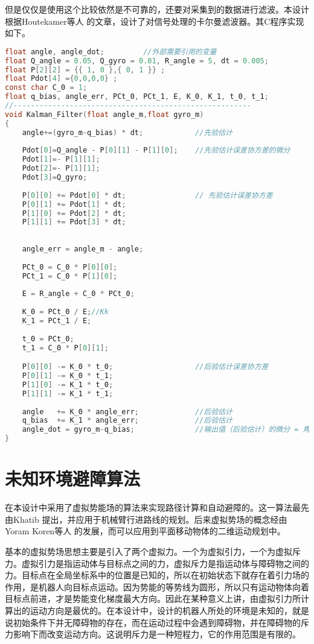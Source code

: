 但是仅仅是使用这个比较依然是不可靠的，还要对采集到的数据进行滤波。本设计根据Houtekamer等人 的文章，设计了对信号处理的卡尔曼滤波器。其C程序实现如下。
\begin{lstlisting}[language={C}, caption={Kalman滤波的C程序代码}]
float angle, angle_dot; 		//外部需要引用的变量
float Q_angle = 0.05, Q_gyro = 0.01, R_angle = 5, dt = 0.005;     
float P[2][2] = {{ 1, 0 },{ 0, 1 }} ;	
float Pdot[4] ={0,0,0,0} ;
const char C_0 = 1;
float q_bias, angle_err, PCt_0, PCt_1, E, K_0, K_1, t_0, t_1;
//-------------------------------------------------------
void Kalman_Filter(float angle_m,float gyro_m)			
{
	angle+=(gyro_m-q_bias) * dt;			//先验估计
	
	Pdot[0]=Q_angle - P[0][1] - P[1][0];	//先验估计误差协方差的微分
	Pdot[1]=- P[1][1];
	Pdot[2]=- P[1][1];
	Pdot[3]=Q_gyro;
	
	P[0][0] += Pdot[0] * dt;				// 先验估计误差协方差
	P[0][1] += Pdot[1] * dt;
	P[1][0] += Pdot[2] * dt;
	P[1][1] += Pdot[3] * dt;
	
	
	angle_err = angle_m - angle;			
	
	PCt_0 = C_0 * P[0][0];
	PCt_1 = C_0 * P[1][0];
	
	E = R_angle + C_0 * PCt_0;
	
	K_0 = PCt_0 / E;//Kk
	K_1 = PCt_1 / E;
	
	t_0 = PCt_0;
	t_1 = C_0 * P[0][1];

	P[0][0] -= K_0 * t_0;					//后验估计误差协方差
	P[0][1] -= K_0 * t_1;
	P[1][0] -= K_1 * t_0;
	P[1][1] -= K_1 * t_1;
	
	angle	+= K_0 * angle_err;				//后验估计
	q_bias	+= K_1 * angle_err;				//后验估计
	angle_dot = gyro_m-q_bias;				//输出值（后验估计）的微分 = 角速度
}
\end{lstlisting}
\section{未知环境避障算法}
在本设计中采用了虚拟势能场的算法来实现路径计算和自动避障的。这一算法最先由Khatib 提出，并应用于机械臂行进路线的规划。后来虚拟势场的概念经由Yoram Koren等人 的发展，而可以应用到平面移动物体的二维运动规划中。

基本的虚拟势场思想主要是引入了两个虚拟力。一个为虚拟引力，一个为虚拟斥力。虚拟引力是指运动体与目标点之间的力，虚拟斥力是指运动体与障碍物之间的力。目标点在全局坐标系中的位置是已知的，所以在初始状态下就存在着引力场的作用，是机器人向目标点运动。因为势能的等势线为圆形，所以只有运动物体向着目标点前进，才是势能变化梯度最大方向。因此在某种意义上讲，由虚拟引力所计算出的运动方向是最优的。在本设计中，设计的机器人所处的环境是未知的，就是说初始条件下并无障碍物的存在，而在运动过程中会遇到障碍物，并在障碍物的斥力影响下而改变运动方向。这说明斥力是一种短程力，它的作用范围是有限的。

